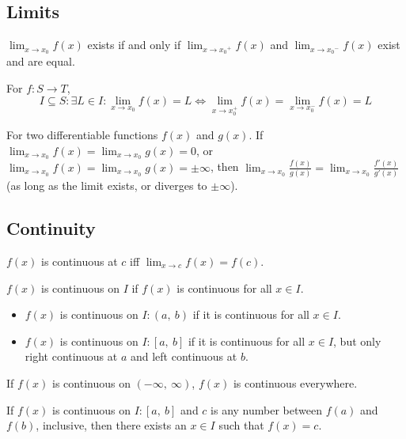 \documentclass{article}
\begin{document}
\subsection{Limits}
\begin{theorem}[Limits]
    $\displaystyle\lim_{x\to x_0} f(x)$ exists if and only if
    $\displaystyle\lim_{x\to {x_0}^+} f(x)$ and $\displaystyle\lim_{x\to {x_0}^-} f(x)$
    exist and are equal.
    
    \noindent For $f:S\to T$,
    \begin{equation*}
        I\subseteq S:\exists L\in I:\lim_{x\to x_0} f(x) = L \iff \lim_{x\to x_0^+} f(x) = \lim_{x\to x_0^-} f(x) = L
    \end{equation*}
\end{theorem}
\begin{theorem}
    For two differentiable functions $f(x)$ and $g(x)$.
    If $\displaystyle \lim_{x\to x_0}f(x)=\lim_{x\to x_0}g(x)=0$,
    or $\displaystyle \lim_{x\to x_0}f(x)=\displaystyle \lim_{x\to x_0}g(x)=\pm\infty$,
    then
    $\lim_{x\to x_0}\frac{f(x)}{g(x)} = \lim_{x\to x_0}\frac{f'(x)}{g'(x)}$
    (as long as the limit exists, or diverges to $\pm\infty$).
\end{theorem}
\subsection{Continuity}
\begin{theorem}
    $f(x)$ is continuous at $c$ iff $\displaystyle \lim_{x\to c} f(x) = f(c)$.
\end{theorem}
\begin{theorem}
    $f(x)$ is continuous on $I$ if $f(x)$ is continuous for all $x\in I$.
\begin{itemize}
    \item $f(x)$ is continuous on $I:\left( a,\:b \right)$ if it is continuous for all $x\in I$.
    \item $f(x)$ is continuous on $I:\left[ a,\:b \right]$ if it is continuous for all $x\in I$, but only right continuous at $a$ and left continuous at $b$.
\end{itemize}
    If $f(x)$  is continuous on $\left(-\infty,\:\infty\right)$, $f(x)$ is continuous everywhere.
\end{theorem}
\begin{theorem}
    If $f(x)$ is continuous on $I:\left[ a, \: b \right]$ and $c$ is any number between $f(a)$ and $f(b)$, inclusive, then there exists an $x\in I$ such that $f(x)=c$.
\end{theorem}
\end{document}
